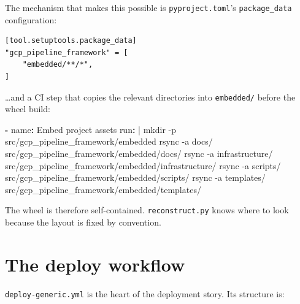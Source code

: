 \documentclass[
  11pt,
  british,
  oneside]{book}
\newenvironment{Shaded}{\begin{snugshade}}{\end{snugshade}}
\newcommand{\AttributeTok}[1]{\textcolor[rgb]{0.77,0.63,0.00}{#1}}
\newcommand{\CharTok}[1]{\textcolor[rgb]{0.31,0.60,0.02}{#1}}
\newcommand{\FunctionTok}[1]{\textcolor[rgb]{0.00,0.00,0.00}{#1}}
\newcommand{\KeywordTok}[1]{\textcolor[rgb]{0.13,0.29,0.53}{\textbf{#1}}}
\newcommand{\NormalTok}[1]{#1}
\begin{document}
The mechanism that makes this possible is \texttt{pyproject.toml}'s
\texttt{package\_data} configuration:

\begin{verbatim}
[tool.setuptools.package_data]
"gcp_pipeline_framework" = [
    "embedded/**/*",
]
\end{verbatim}

\ldots and a CI step that copies the relevant directories into
\texttt{embedded/} before the wheel build:

\begin{Shaded}
\begin{Highlighting}[]
\KeywordTok{{-}}\AttributeTok{ }\FunctionTok{name}\KeywordTok{:}\AttributeTok{ Embed project assets}
\FunctionTok{  run}\KeywordTok{: }\CharTok{|}
\NormalTok{    mkdir {-}p src/gcp\_pipeline\_framework/embedded}
\NormalTok{    rsync {-}a docs/ src/gcp\_pipeline\_framework/embedded/docs/}
\NormalTok{    rsync {-}a infrastructure/ src/gcp\_pipeline\_framework/embedded/infrastructure/}
\NormalTok{    rsync {-}a scripts/ src/gcp\_pipeline\_framework/embedded/scripts/}
\NormalTok{    rsync {-}a templates/ src/gcp\_pipeline\_framework/embedded/templates/}
\end{Highlighting}
\end{Shaded}

The wheel is therefore self-contained. \texttt{reconstruct.py} knows
where to look because the layout is fixed by convention.

\hypertarget{the-deploy-workflow}{%
\section{The deploy workflow}\label{the-deploy-workflow}}

\texttt{deploy-generic.yml} is the heart of the deployment story. Its
structure is:
\end{document}
